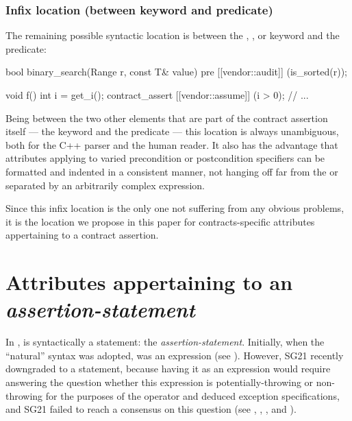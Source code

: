 \subsubsection{Infix location (between keyword and predicate)}

The remaining possible syntactic location is between the , , or  keyword and the predicate:

\begin{codeblock}
bool binary_search(Range r, const T& value)
  pre [[vendor::audit]] (is_sorted(r));
  
void f() {
  int i = get_i();
  contract_assert [[vendor::assume]] (i > 0);
  // ...
}
\end{codeblock}

Being between the two other elements that are part of the contract assertion itself --- the keyword and the predicate --- this location is always unambiguous, both for the C++ parser and the human reader. It also has the advantage that attributes applying to varied precondition or postcondition specifiers can be formatted and indented in a consistent manner, not hanging off far from the  or  separated by an arbitrarily complex expression.

Since this infix location is the only one not suffering from any obvious problems, it is the location we propose in this paper for contracts-specific attributes appertaining to a contract assertion.



\section{Attributes appertaining to an \emph{assertion-statement}}
\label{sec:stmt}

In \cite{P2900R5},  is syntactically a statement: the \emph{assertion-statement}. Initially, when the ``natural'' syntax was adopted,  was an expression (see \cite{P2961R2}). However, SG21 recently downgraded  to a statement, because having it as an expression would require answering the question whether this expression is potentially-throwing or non-throwing for the purposes of the  operator and deduced exception specifications, and SG21 failed to reach a consensus on this question (see \cite{P2932R3}, \cite{P2969R0}, \cite{P3113R0}, and \cite{P3114R0}).

